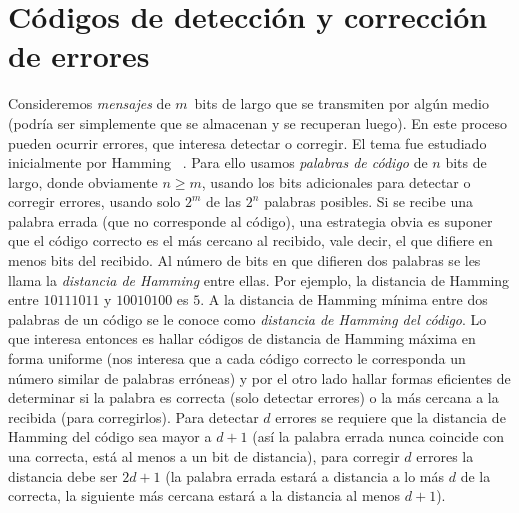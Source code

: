 %

\section{Códigos de detección y corrección de errores}
\label{sec:codigos-errores}

  Consideremos \emph{mensajes} de \(m\)~bits de largo%
  que se transmiten por algún medio
  (podría ser simplemente que se almacenan y se recuperan luego).
  En este proceso pueden ocurrir errores,
  que interesa detectar o corregir.
  El tema fue estudiado inicialmente por Hamming~%
    \cite{hamming50:_error_detec_correc_codes}.%
  Para ello usamos \emph{palabras de código}
  de \(n\) bits de largo,%
  donde obviamente \(n \ge m\),
  usando los bits adicionales para detectar o corregir errores,
  usando solo \(2^m\) de las \(2^n\) palabras posibles.
  Si se recibe una palabra errada
  (que no corresponde al código),
  una estrategia obvia es suponer que el código correcto
  es el más cercano al recibido,
  vale decir,
  el que difiere en menos bits del recibido.
  Al número de bits en que difieren dos palabras se les llama
  la \emph{distancia de Hamming}%
  entre ellas.
  Por ejemplo,
  la distancia de Hamming entre \(10111011\) y \(10010100\)
  es \(5\).
  A la distancia de Hamming mínima entre dos palabras de un código
  se le conoce como \emph{distancia de Hamming del código}.%
  Lo que interesa entonces es hallar códigos
  de distancia de Hamming máxima
  en forma uniforme
  (nos interesa que a cada código correcto
   le corresponda un número similar
   de palabras erróneas)
  y por el otro lado hallar formas eficientes
  de determinar si la palabra es correcta
  (solo detectar errores)%
  o la más cercana a la recibida
  (para corregirlos).%
  Para detectar \(d\) errores
  se requiere que la distancia de Hamming
  del código sea mayor a \(d + 1\)
  (así la palabra errada nunca coincide con una correcta,
   está al menos a un bit de distancia),
  para corregir \(d\) errores la distancia debe ser \(2 d + 1\)
  (la palabra errada estará a distancia a lo más \(d\)
   de la correcta,
   la siguiente más cercana estará
   a la distancia al menos \(d + 1\)).

